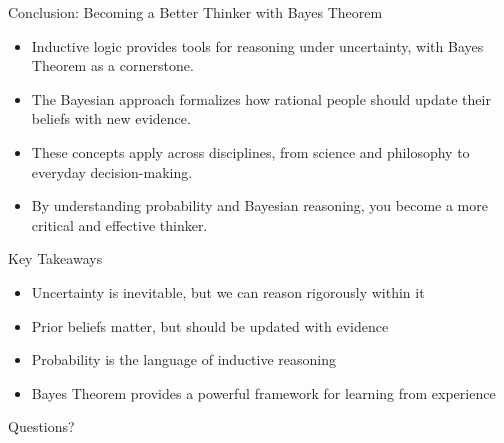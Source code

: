 \documentclass{beamer}
\begin{document}
	\begin{frame}{Conclusion: Becoming a Better Thinker with Bayes Theorem}
		\begin{itemize}
			\item Inductive logic provides tools for reasoning under uncertainty, with Bayes Theorem as a cornerstone.
			\item The Bayesian approach formalizes how rational people should update their beliefs with new evidence.
			\item These concepts apply across disciplines, from science and philosophy to everyday decision-making.
			\item By understanding probability and Bayesian reasoning, you become a more critical and effective thinker.
		\end{itemize}
		
		\begin{alertblock}{Key Takeaways}
			\scriptsize
			\begin{itemize}
				\item Uncertainty is inevitable, but we can reason rigorously within it
				\item Prior beliefs matter, but should be updated with evidence
				\item Probability is the language of inductive reasoning
				\item Bayes Theorem provides a powerful framework for learning from experience
			\end{itemize}
		\end{alertblock}
		
		\begin{center}
			\large{Questions?}
		\end{center}
	\end{frame}
	
	
\end{document}
